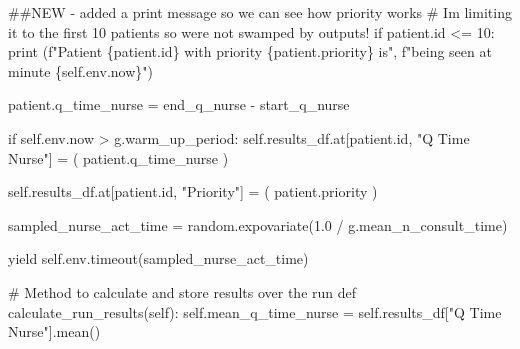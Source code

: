 \documentclass[
  letterpaper,
  DIV=11,
  numbers=noendperiod]{scrreprt}
\newenvironment{Shaded}{\begin{snugshade}}{\end{snugshade}}
\newcommand{\BuiltInTok}[1]{\textcolor[rgb]{0.00,0.23,0.31}{#1}}
\newcommand{\CommentTok}[1]{\textcolor[rgb]{0.37,0.37,0.37}{#1}}
\newcommand{\ControlFlowTok}[1]{\textcolor[rgb]{0.00,0.23,0.31}{#1}}
\newcommand{\DecValTok}[1]{\textcolor[rgb]{0.68,0.00,0.00}{#1}}
\newcommand{\FloatTok}[1]{\textcolor[rgb]{0.68,0.00,0.00}{#1}}
\newcommand{\KeywordTok}[1]{\textcolor[rgb]{0.00,0.23,0.31}{#1}}
\newcommand{\NormalTok}[1]{\textcolor[rgb]{0.00,0.23,0.31}{#1}}
\newcommand{\OperatorTok}[1]{\textcolor[rgb]{0.37,0.37,0.37}{#1}}
\newcommand{\SpecialCharTok}[1]{\textcolor[rgb]{0.37,0.37,0.37}{#1}}
\newcommand{\SpecialStringTok}[1]{\textcolor[rgb]{0.13,0.47,0.30}{#1}}
\newcommand{\StringTok}[1]{\textcolor[rgb]{0.13,0.47,0.30}{#1}}
\newcommand{\VariableTok}[1]{\textcolor[rgb]{0.07,0.07,0.07}{#1}}
\begin{document}
\begin{tcolorbox}
\begin{Shaded}
\begin{Highlighting}[]
            \CommentTok{\#\#NEW {-} added a print message so we can see how priority works}
            \CommentTok{\# I\textquotesingle{}m limiting it to the first 10 patients so we\textquotesingle{}re not swamped by outputs!}
            \ControlFlowTok{if}\NormalTok{ patient.}\BuiltInTok{id} \OperatorTok{\textless{}=} \DecValTok{10}\NormalTok{:}
                \BuiltInTok{print}\NormalTok{ (}\SpecialStringTok{f"Patient }\SpecialCharTok{\{}\NormalTok{patient}\SpecialCharTok{.}\BuiltInTok{id}\SpecialCharTok{\}}\SpecialStringTok{ with priority }\SpecialCharTok{\{}\NormalTok{patient}\SpecialCharTok{.}\NormalTok{priority}\SpecialCharTok{\}}\SpecialStringTok{ is"}\NormalTok{,}
                    \SpecialStringTok{f"being seen at minute }\SpecialCharTok{\{}\VariableTok{self}\SpecialCharTok{.}\NormalTok{env}\SpecialCharTok{.}\NormalTok{now}\SpecialCharTok{\}}\SpecialStringTok{"}\NormalTok{)}

\NormalTok{            patient.q\_time\_nurse }\OperatorTok{=}\NormalTok{ end\_q\_nurse }\OperatorTok{{-}}\NormalTok{ start\_q\_nurse}

            \ControlFlowTok{if} \VariableTok{self}\NormalTok{.env.now }\OperatorTok{\textgreater{}}\NormalTok{ g.warm\_up\_period:}
                \VariableTok{self}\NormalTok{.results\_df.at[patient.}\BuiltInTok{id}\NormalTok{, }\StringTok{"Q Time Nurse"}\NormalTok{] }\OperatorTok{=}\NormalTok{ (}
\NormalTok{                    patient.q\_time\_nurse}
\NormalTok{                )}

                \VariableTok{self}\NormalTok{.results\_df.at[patient.}\BuiltInTok{id}\NormalTok{, }\StringTok{"Priority"}\NormalTok{] }\OperatorTok{=}\NormalTok{ (}
\NormalTok{                    patient.priority}
\NormalTok{                )}

\NormalTok{            sampled\_nurse\_act\_time }\OperatorTok{=}\NormalTok{ random.expovariate(}\FloatTok{1.0} \OperatorTok{/}
\NormalTok{                                                        g.mean\_n\_consult\_time)}

            \ControlFlowTok{yield} \VariableTok{self}\NormalTok{.env.timeout(sampled\_nurse\_act\_time)}

    \CommentTok{\# Method to calculate and store results over the run}
    \KeywordTok{def}\NormalTok{ calculate\_run\_results(}\VariableTok{self}\NormalTok{):}
        \VariableTok{self}\NormalTok{.mean\_q\_time\_nurse }\OperatorTok{=} \VariableTok{self}\NormalTok{.results\_df[}\StringTok{"Q Time Nurse"}\NormalTok{].mean()}


\end{Highlighting}
\end{Shaded}
\end{tcolorbox}
\end{document}
